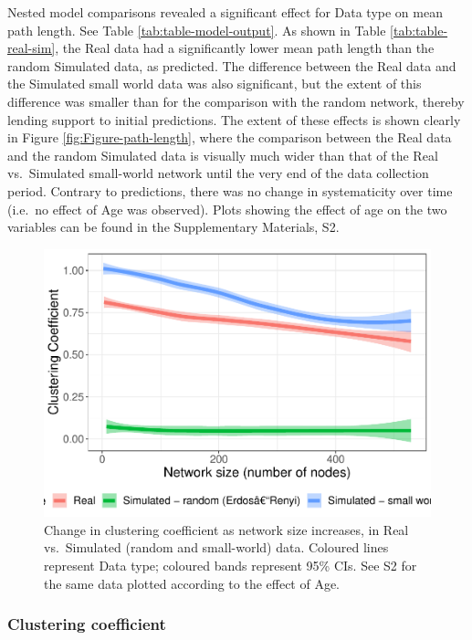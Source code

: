 \documentclass[
  man]{apa6}
\begin{document}
Nested model comparisons revealed a significant effect for Data type on mean path length. See Table \ref{tab:table-model-output}. As shown in Table \ref{tab:table-real-sim}, the Real data had a significantly lower mean path length than the random Simulated data, as predicted. The difference between the Real data and the Simulated small world data was also significant, but the extent of this difference was smaller than for the comparison with the random network, thereby lending support to initial predictions. The extent of these effects is shown clearly in Figure \ref{fig:Figure-path-length}, where the comparison between the Real data and the random Simulated data is visually much wider than that of the Real vs.~Simulated small-world network until the very end of the data collection period. Contrary to predictions, there was no change in systematicity over time (i.e.~no effect of Age was observed). Plots showing the effect of age on the two variables can be found in the Supplementary Materials, S2.

\begin{figure}
\centering
\includegraphics{NetworkGraphs_files/figure-latex/Figure-clust-coef-1.pdf}
\caption{\label{fig:Figure-clust-coef}Change in clustering coefficient as network size increases, in Real vs.~Simulated (random and small-world) data. Coloured lines represent Data type; coloured bands represent 95\% CIs. See S2 for the same data plotted according to the effect of Age.}
\end{figure}

\hypertarget{clustering-coefficient}{%
\subsubsection{Clustering coefficient}\label{clustering-coefficient}}
\end{document}
